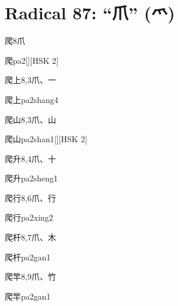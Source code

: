 
\section*{Radical 87: ``⽖'' (爫)}

\begin{entry}{爬}{8}{⽖}
  \begin{phonetics}{爬}{pa2}[][HSK 2]
  \end{phonetics}
\end{entry}

\begin{entry}{爬上}{8,3}{⽖、⼀}
  \begin{phonetics}{爬上}{pa2shang4}
  \end{phonetics}
\end{entry}

\begin{entry}{爬山}{8,3}{⽖、⼭}
  \begin{phonetics}{爬山}{pa2shan1}[][HSK 2]
  \end{phonetics}
\end{entry}

\begin{entry}{爬升}{8,4}{⽖、⼗}
  \begin{phonetics}{爬升}{pa2sheng1}
  \end{phonetics}
\end{entry}

\begin{entry}{爬行}{8,6}{⽖、⾏}
  \begin{phonetics}{爬行}{pa2xing2}
  \end{phonetics}
\end{entry}

\begin{entry}{爬杆}{8,7}{⽖、⽊}
  \begin{phonetics}{爬杆}{pa2gan1}
  \end{phonetics}
\end{entry}

\begin{entry}{爬竿}{8,9}{⽖、⽵}
  \begin{phonetics}{爬竿}{pa2gan1}
  \end{phonetics}
\end{entry}

